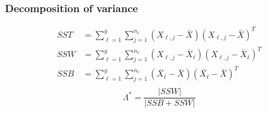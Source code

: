 \documentclass[aspectratio=169,10pt,t]{beamer}
\begin{document}
\begin{frame}[t]
	\frametitle{Decomposition of variance}
	\[
		\begin{aligned}
			SST &=
			\sum^{g}_{\ell=1} 
			\sum^{n_{\ell}}_{j=1} 
			\left( X_{\ell,j}- \bar{X} \right) 
			\left( X_{\ell,j}- \bar{X} \right) ^{T}\\
			SSW &=
			\sum^{g}_{\ell=1} 
			\sum^{n_{\ell}}_{j=1} 
			\left( X_{\ell,j}- \bar{X}_{\ell} \right) 
			\left( X_{\ell,j}- \bar{X}_{\ell} \right) ^{T}\\
			SSB &=
			\sum^{g}_{\ell=1} 
			\sum^{n_\ell}_{j=1} 
			\left( \bar{X_{\ell}}- \bar{X} \right) 
			\left( \bar{X_{\ell}}- \bar{X} \right) ^{T}\\
		\end{aligned}
	\] 
	\vspace{1cm}
	\pause
	\[
		\Lambda ^{*} = \frac{|SSW|}{|SSB + SSW |} 
	\] 

\end{frame}
\end{document}
